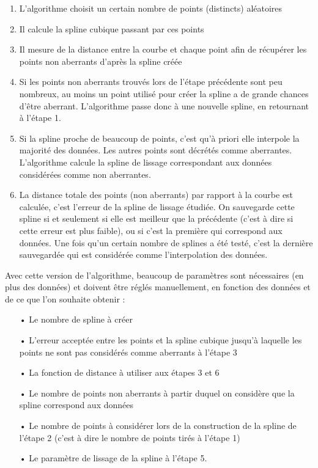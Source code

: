 \documentclass[a4paper,12pt]{article} %
\begin{document}
                    \begin{enumerate}
                    \item
                    L'algorithme choisit un certain nombre de points (distincts) aléatoires
                    \item
                    Il calcule la spline cubique passant par ces points 
                    \item
                    Il mesure de la distance entre la courbe et chaque point afin de récupérer les points non aberrants d'après la spline créée
                    \item
                    Si les points non aberrants trouvés lors de l'étape précédente sont peu nombreux, au moins un point utilisé pour créer la spline a de grande chances d'être aberrant. L'algorithme passe donc à une nouvelle spline, en retournant à l'étape 1.
                    \item
                    Si la spline proche de beaucoup de points, c'est qu'à priori elle interpole la majorité des données. Les autres points sont décrétés comme aberrantes.  L'algorithme calcule la spline de lissage correspondant aux données considérées comme non aberrantes.
                    \item
                    La distance totale des points (non aberrants) par rapport à la courbe est calculée, c'est l'erreur de la spline de lissage étudiée. On sauvegarde cette spline si et seulement si elle est meilleur que la précédente (c'est à dire si cette erreur est plus faible), ou si c'est la première qui correspond aux données.
                    Une fois qu'un certain nombre de splines a été testé, c'est la dernière sauvegardée qui est considérée comme l'interpolation des données.
                    \end{enumerate} 
                    
                    Avec cette version de l'algorithme, beaucoup de paramètres sont nécessaires (en plus des données) et doivent être réglés manuellement, en fonction des données et de ce que l'on souhaite obtenir :
                    \begin{itemize}
                    \item[•] Le nombre de spline à créer
                    \item[•]  L'erreur acceptée entre les points et la spline cubique jusqu'à laquelle les points ne sont pas considérés comme aberrants à l'étape 3
                    \item[•]  La fonction de distance à utiliser aux étapes 3 et 6
                    \item[•] Le nombre de points non aberrants à partir duquel on considère que la spline correspond aux données
                    \item[•]  Le nombre de points à considérer lors de la construction de la spline de l'étape 2 (c'est à dire le nombre de points tirés à l'étape 1)
                    \item[•] Le paramètre de lissage de la spline à l'étape 5.
                    \end{itemize}
                    
\end{document}
